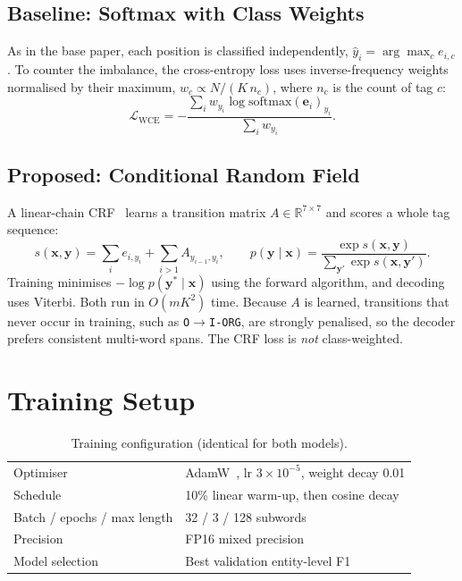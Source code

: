 \subsection{Baseline: Softmax with Class Weights}

As in the base paper, each position is classified independently,
$\hat{y}_i = \arg\max_c e_{i,c}$. To counter the imbalance, the
cross-entropy loss uses inverse-frequency weights normalised by their
maximum, $w_c \propto N / (K\, n_c)$, where $n_c$ is the count of tag $c$:
\begin{equation}\label{eq:wce}
\mathcal{L}_{\mathrm{WCE}} = -\frac{\sum_{i} w_{y_i} \log \mathrm{softmax}(\mathbf{e}_i)_{y_i}}{\sum_{i} w_{y_i}}.
\end{equation}

\subsection{Proposed: Conditional Random Field}

A linear-chain CRF~\cite{lafferty2001conditional, lample2016neural} learns a
transition matrix $A \in \mathbb{R}^{7 \times 7}$ and scores a whole tag
sequence:
\begin{equation}
s(\mathbf{x}, \mathbf{y}) = \sum_{i} e_{i, y_i} + \sum_{i>1} A_{y_{i-1}, y_i}, \qquad
p(\mathbf{y} \mid \mathbf{x}) = \frac{\exp s(\mathbf{x}, \mathbf{y})}{\sum_{\mathbf{y}'} \exp s(\mathbf{x}, \mathbf{y}')}.
\end{equation}
Training minimises $-\log p(\mathbf{y}^{\ast} \mid \mathbf{x})$ using the
forward algorithm, and decoding uses Viterbi. Both run in $O(mK^2)$ time.
Because $A$ is learned, transitions that never occur in training, such as
\texttt{O}$\rightarrow$\texttt{I-ORG}, are strongly penalised, so the
decoder prefers consistent multi-word spans. The CRF loss is \emph{not}
class-weighted.

\section{Training Setup}

\begin{table}[H]
\centering
\caption{Training configuration (identical for both models).}
\label{tab:hparams}
\begin{tabular}{ll}
\toprule
Optimiser & AdamW~\cite{loshchilov2019decoupled}, lr $3\times10^{-5}$, weight decay 0.01 \\
Schedule & 10\% linear warm-up, then cosine decay \\
Batch / epochs / max length & 32 / 3 / 128 subwords \\
Precision & FP16 mixed precision~\cite{micikevicius2018mixed} \\
Model selection & Best validation entity-level F1 \\
\bottomrule
\end{tabular}
\end{table}


